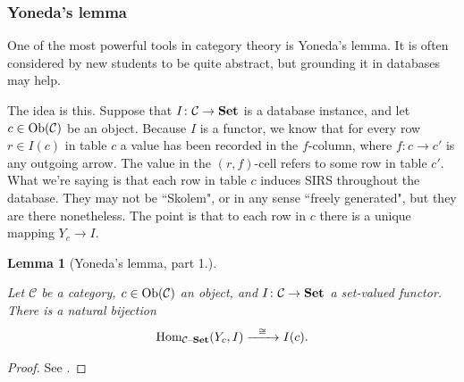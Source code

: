 \documentclass{book}
\def\tn{\textnormal}
\def\mc{\mathcal}
\def\Hom{\tn{Hom}}
\def\Ob{\tn{Ob}}
\def\to{\rightarrow}
\def\taking{\colon}
\def\iso{\cong}
\newcommand{\Too}[1]{\xrightarrow{\ \ #1\ \ }}
\def\Set{{\bf Set}}
\def\set{{\text \textendash}{\bf Set}}
\def\mcC{\mc{C}}
\newtheorem{lemma}[subsubsection]{Lemma}
\theoremstyle{remark}
\theoremstyle{definition}
\begin{document}

\subsubsection{Yoneda's lemma}\label{sec:yoneda}

One of the most powerful tools in category theory is Yoneda's lemma. It is often considered by new students to be quite abstract, but grounding it in databases may help.

The idea is this. Suppose that $I\taking\mcC\to\Set$ is a database instance, and let $c\in\Ob(\mcC)$ be an object. Because $I$ is a functor, we know that for every row $r\in I(c)$ in table $c$ a value has been recorded in the $f$-column, where $f\taking c\to c'$ is any outgoing arrow. The value in the $(r,f)$-cell refers to some row in table $c'$. What we're saying is that each row in table $c$ induces SIRS throughout the database. They may not be ``Skolem", or in any sense ``freely generated", but they are there nonetheless. The point is that to each row in $c$ there is a unique mapping $Y_c\to I$. 

\begin{lemma}[Yoneda's lemma, part 1.]\label{lemma:Yoneda}

Let $\mcC$ be a category, $c\in\Ob(\mcC)$ an object, and $I\taking\mcC\to\Set$ a set-valued functor. There is a natural bijection $$\Hom_{\mcC\set}(Y_c,I)\Too{\iso}I(c).$$

\end{lemma}

\begin{proof}

See \cite{Mac}.

\end{proof}
\end{document}
